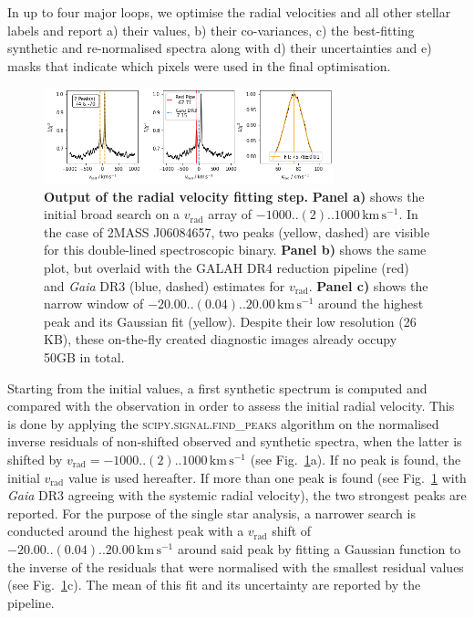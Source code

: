 \documentclass[
  journal=pasa,
  manuscript=research-paper, %
  year=2024,
  volume=37
]{cup-journal}
\newcommand{\vrad}{$v_\mathrm{rad}$\xspace}
\newcommand{\Gaia}{\textit{Gaia}\xspace}
\newcommand{\kms}{\,\mathrm{km\,s^{-1}}}	%
\begin{document}
In up to four major loops, we optimise the radial velocities and all other stellar labels and report a) their values, b) their co-variances, c) the best-fitting synthetic and re-normalised spectra along with d) their uncertainties and e) masks that indicate which pixels were used in the final optimisation.

\begin{figure}[ht]
\centering
\includegraphics[width=0.75\textwidth]{figures/181221003101356_single_fit_rv.png}
\caption{\textbf{Output of the radial velocity fitting step.} \textbf{Panel a)} shows the initial broad search on a \vrad array of $-1000..(2)..1000\kms$. In the case of 2MASS J06084657, two peaks (yellow, dashed) are visible for this double-lined spectroscopic binary. \textbf{Panel b)} shows the same plot, but overlaid with the GALAH DR4 reduction pipeline (red) and \Gaia DR3 (blue, dashed) estimates for \vrad. \textbf{Panel c)} shows the narrow window of $-20.00..(0.04)..20.00\kms$ around the highest peak and its Gaussian fit (yellow). Despite their low resolution (26 KB), these on-the-fly created diagnostic images already occupy 50GB in total.}
\label{fig:181221003101356_single_fit_rv}
\end{figure}

Starting from the initial values, a first synthetic spectrum is computed and compared with the observation in order to assess the initial radial velocity. This is done by applying the \textsc{scipy.signal.find\_peaks} algorithm on the normalised inverse residuals of non-shifted observed and synthetic spectra, when the latter is shifted by $v_\text{rad} = -1000..(2)..1000\kms$ (see Fig.~\ref{fig:181221003101356_single_fit_rv}a). If no peak is found, the initial \vrad value is used hereafter. If more than one peak is found (see Fig.~\ref{fig:181221003101356_single_fit_rv} with \Gaia DR3 agreeing with the systemic radial velocity), the two strongest peaks are reported. For the purpose of the single star analysis, a narrower search is conducted around the highest peak with a \vrad shift of $-20.00..(0.04)..20.00\kms$ around said peak by fitting a Gaussian function to the inverse of the residuals that were normalised with the smallest residual values (see Fig.~\ref{fig:181221003101356_single_fit_rv}c). The mean of this fit and its uncertainty are reported by the pipeline.
\end{document}
